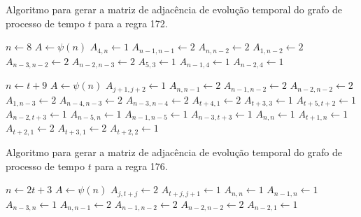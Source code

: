 \documentclass[12pt,a4paper]{article}
\begin{document}
\begin{algorithm}[H]
\caption{Algoritmo para gerar a matriz de adjacência de evolução temporal do
grafo de processo de tempo $t$ para a regra 172.}
\label{alg:r172}
\begin{algorithmic}
    \STATE $n \leftarrow 8$
    \STATE $A \leftarrow \psi(n)$
    \STATE $A_{4,n} \leftarrow 1$
    \STATE $A_{n-1,n-1} \leftarrow 2$
    \STATE $A_{n,n-2} \leftarrow 2$
    \STATE $A_{1,n-2} \leftarrow 2$
    \STATE $A_{n-3,n-2} \leftarrow 2$
    \STATE $A_{n-2,n-3} \leftarrow 2$
    \STATE $A_{5,3} \leftarrow 1$
    \STATE $A_{n-1,4} \leftarrow 1$
    \STATE $A_{n-2,4} \leftarrow 1$
\end{algorithmic}
\end{algorithm}

\begin{algorithm}[H]
\begin{algorithmic}
\ELSE
    \STATE $n \leftarrow t+9$
    \STATE $A \leftarrow \psi(n)$
        \STATE $A_{j+1,j+2} \leftarrow 1$
    \ENDFOR
    \STATE $A_{n,n-1} \leftarrow 2$
    \STATE $A_{n-1,n-2} \leftarrow 2$
    \STATE $A_{n-2,n-2} \leftarrow 2$
    \STATE $A_{1,n-3} \leftarrow 2$
    \STATE $A_{n-4,n-3} \leftarrow 2$
    \STATE $A_{n-3,n-4} \leftarrow 2$
    \STATE $A_{t+4,1} \leftarrow 2$
    \STATE $A_{t+3,3} \leftarrow 1$
    \STATE $A_{t+5,t+2} \leftarrow 1$
    \STATE $A_{n-2,t+3} \leftarrow 1$
    \STATE $A_{n-5,n} \leftarrow 1$
    \STATE $A_{n-1,n-5} \leftarrow 1$
    \STATE $A_{n-3,t+3} \leftarrow 1$
\ENDIF
\STATE $A_{n,n} \leftarrow 1$
\STATE $A_{t+1,n} \leftarrow 1$
\STATE $A_{t+2,1} \leftarrow 2$
\STATE $A_{t+3,1} \leftarrow 2$
\STATE $A_{t+2,2} \leftarrow 1$
\end{algorithmic}
\end{algorithm}

\begin{algorithm}[H]
\caption{Algoritmo para gerar a matriz de adjacência de evolução temporal do
grafo de processo de tempo $t$ para a regra 176.}
\label{alg:r176}
\begin{algorithmic}
\STATE $n \leftarrow 2t+3$
\STATE $A \leftarrow \psi(n)$
    \STATE $A_{j,t+j} \leftarrow 2$
\ENDFOR
{}
    \STATE $A_{t+j,j+1} \leftarrow 1$
\ENDFOR
\STATE $A_{n,n} \leftarrow 1$
\STATE $A_{n-1,n} \leftarrow 1$
\STATE $A_{n-3,n} \leftarrow 1$
\STATE $A_{n,n-1} \leftarrow 2$
\STATE $A_{n-1,n-2} \leftarrow 2$
\STATE $A_{n-2,n-2} \leftarrow 2$
\STATE $A_{n-2,1} \leftarrow 1$
\end{algorithmic}
\end{algorithm}
\end{document}
